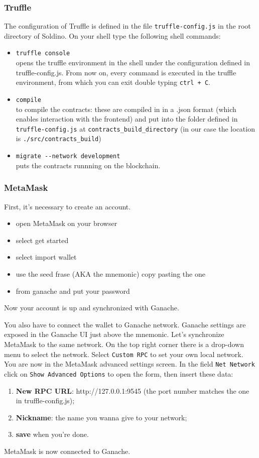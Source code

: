 \subsubsection{Truffle}
The configuration of Truffle is defined in the file \texttt{truffle-config.js} in the root directory of Soldino.
On your shell type the following shell commands:
\begin{itemize}
	\item \texttt{truffle console}\\
	opens the truffle environment in the shell under the configuration defined in truffle-config.js. From now on, every command is executed in the truffle environment, from which you can exit double typing \texttt{ctrl + C}.
	\item \texttt{compile}\\
	to compile the contracts: these are compiled in in a .json format (which enables interaction with the frontend) and put into the folder defined in \texttt{truffle-config.js} at \texttt{contracts\_build\_directory} (in our case the location is \texttt{./src/contracts\_build})
	\item \texttt{migrate -{}-network development}\\
	puts the contracts runnning on the blockchain. 
\end{itemize}

\subsubsection{MetaMask}
First, it's necessary to create an account.
\begin{itemize}
	\item open MetaMask on your browser
	\item select get started
	\item select import wallet
	\item use the seed frase (AKA the mnemonic) copy pasting the one \item from ganache and put your password
\end{itemize}
Now your account is up and synchronized with Ganache.

You also have to connect the wallet to Ganache network. Ganache settings are exposed in the Ganache UI just above the mnemonic.
Let's synchronize MetaMask to the same network. On the top right corner there is a drop-down menu to select the network. Select \texttt{Custom RPC} to set your own local network.\\
You are now in the MetaMask advanced settings screen. In the field \texttt{Net Network} click on \texttt{Show Advanced Options} to open the form, then insert these data:
\begin{enumerate}
	\item \textbf{New RPC URL}: http://127.0.0.1:9545 (the port number matches the one in truffle-config.js);
	\item \textbf{Nickname}: the name you wanna give to your network;
	\item \textbf{save} when you're done.
\end{enumerate}
MetaMask is now connected to Ganache.\\


